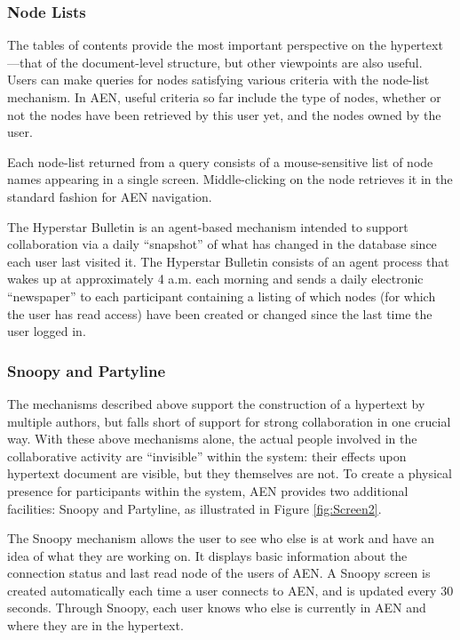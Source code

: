 \subsubsection{Node Lists}

The tables of contents provide the most important perspective on the
hypertext---that of the document-level structure, but other viewpoints are
also useful.  Users can make queries for nodes satisfying various criteria
with the node-list mechanism. In AEN, useful criteria so far include the
type of nodes, whether or not the nodes have been retrieved by this user
yet, and the nodes owned by the user.

Each node-list returned from a query consists of a mouse-sensitive
list of node names appearing in a single screen. Middle-clicking
on the node retrieves it in the standard fashion for AEN navigation.

The Hyperstar Bulletin  is an agent-based
mechanism intended to support collaboration via a daily ``snapshot'' of
what has changed in the database since each user last visited it.  The
Hyperstar Bulletin consists of an agent process that wakes up at
approximately 4 a.m. each morning and sends a daily electronic
``newspaper'' to each participant containing a listing of which nodes (for
which the user has read access) have been created or changed since the last
time the user logged in. 


\subsubsection{Snoopy and Partyline}

The mechanisms described above support the construction of a hypertext by
multiple authors, but falls short of support for strong collaboration in
one crucial way.  With these above mechanisms alone, the actual people
involved in the collaborative activity are ``invisible'' within the system:
their effects upon hypertext document are visible, but they themselves are
not.  To create a physical presence for participants within the system, AEN
provides two additional facilities: Snoopy and Partyline, as illustrated in
Figure \ref{fig:Screen2}.

The Snoopy mechanism allows the user to see who else is at work and have an
idea of what they are working on.  It displays basic information about the
connection status and last read node of the users of AEN. A Snoopy screen
is created automatically each time a user connects to AEN, and is updated
every 30 seconds.  Through Snoopy, each user knows who else is currently in
AEN and where they are in the hypertext.

